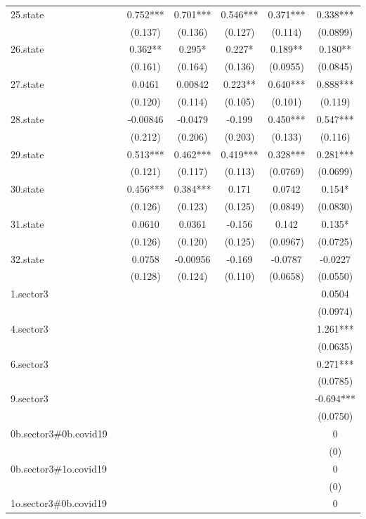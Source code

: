 \documentclass[]{article}
\begin{document}
\begin{tabular}{lcccccc}
25.state &  & 0.752*** & 0.701*** & 0.546*** & 0.371*** & 0.338*** \\
 &  & (0.137) & (0.136) & (0.127) & (0.114) & (0.0899) \\
26.state &  & 0.362** & 0.295* & 0.227* & 0.189** & 0.180** \\
 &  & (0.161) & (0.164) & (0.136) & (0.0955) & (0.0845) \\
27.state &  & 0.0461 & 0.00842 & 0.223** & 0.640*** & 0.888*** \\
 &  & (0.120) & (0.114) & (0.105) & (0.101) & (0.119) \\
28.state &  & -0.00846 & -0.0479 & -0.199 & 0.450*** & 0.547*** \\
 &  & (0.212) & (0.206) & (0.203) & (0.133) & (0.116) \\
29.state &  & 0.513*** & 0.462*** & 0.419*** & 0.328*** & 0.281*** \\
 &  & (0.121) & (0.117) & (0.113) & (0.0769) & (0.0699) \\
30.state &  & 0.456*** & 0.384*** & 0.171 & 0.0742 & 0.154* \\
 &  & (0.126) & (0.123) & (0.125) & (0.0849) & (0.0830) \\
31.state &  & 0.0610 & 0.0361 & -0.156 & 0.142 & 0.135* \\
 &  & (0.126) & (0.120) & (0.125) & (0.0967) & (0.0725) \\
32.state &  & 0.0758 & -0.00956 & -0.169 & -0.0787 & -0.0227 \\
 &  & (0.128) & (0.124) & (0.110) & (0.0658) & (0.0550) \\
1.sector3 &  &  &  &  &  & 0.0504 \\
 &  &  &  &  &  & (0.0974) \\
4.sector3 &  &  &  &  &  & 1.261*** \\
 &  &  &  &  &  & (0.0635) \\
6.sector3 &  &  &  &  &  & 0.271*** \\
 &  &  &  &  &  & (0.0785) \\
9.sector3 &  &  &  &  &  & -0.694*** \\
 &  &  &  &  &  & (0.0750) \\
0b.sector3\#0b.covid19 &  &  &  &  &  & 0 \\
 &  &  &  &  &  & (0) \\
0b.sector3\#1o.covid19 &  &  &  &  &  & 0 \\
 &  &  &  &  &  & (0) \\
1o.sector3\#0b.covid19 &  &  &  &  &  & 0 \\

\end{tabular}
\end{document}
